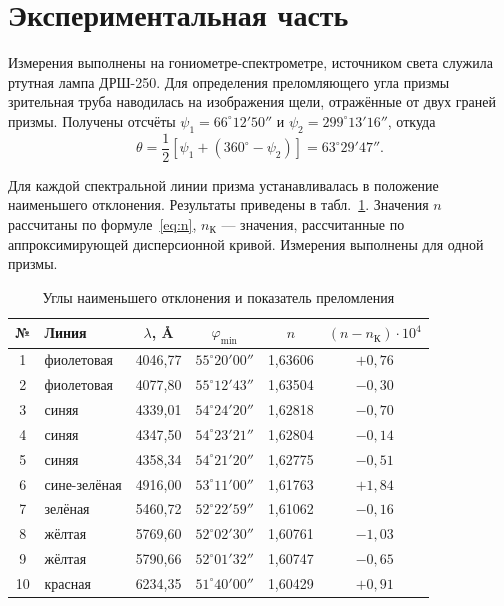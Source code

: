 \documentclass[14pt,a4paper]{extarticle}
\begin{document}
\section*{Экспериментальная часть}

Измерения выполнены на гониометре-спектрометре, источником света служила ртутная лампа ДРШ-250. Для определения преломляющего угла призмы зрительная труба наводилась на изображения щели, отражённые от двух граней призмы. Получены отсчёты $\psi_1 = 66^\circ 12' 50''$ и $\psi_2 = 299^\circ 13' 16''$, откуда
\[
  \theta = \frac{1}{2}\left[\psi_1 + \left(360^\circ - \psi_2\right)\right] = 63^\circ 29' 47''.
\]

Для каждой спектральной линии призма устанавливалась в положение наименьшего отклонения. Результаты приведены в табл.~\ref{tab:phi}. Значения $n$ рассчитаны по формуле~\eqref{eq:n}, $n_{\text{К}}$ --- значения, рассчитанные по аппроксимирующей дисперсионной кривой. Измерения выполнены для одной призмы.

\begin{table}[htbp]
\caption{Углы наименьшего отклонения и показатель преломления}
\label{tab:phi}
\centering
\small
\setlength{\tabcolsep}{5pt}
\begin{tabular}{clcccc}
\toprule
№ & Линия & $\lambda$, \AA & $\varphi_{\min}$ & $n$ & $(n - n_{\text{К}})\cdot 10^{4}$ \\
\midrule
1 & фиолетовая & 4046,77 & $55^\circ 20' 00''$ & 1,63606 & $+0{,}76$ \\
2 & фиолетовая & 4077,80 & $55^\circ 12' 43''$ & 1,63504 & $-0{,}30$ \\
3 & синяя & 4339,01 & $54^\circ 24' 20''$ & 1,62818 & $-0{,}70$ \\
4 & синяя & 4347,50 & $54^\circ 23' 21''$ & 1,62804 & $-0{,}14$ \\
5 & синяя & 4358,34 & $54^\circ 21' 20''$ & 1,62775 & $-0{,}51$ \\
6 & сине-зелёная & 4916,00 & $53^\circ 11' 00''$ & 1,61763 & $+1{,}84$ \\
7 & зелёная & 5460,72 & $52^\circ 22' 59''$ & 1,61062 & $-0{,}16$ \\
8 & жёлтая & 5769,60 & $52^\circ 02' 30''$ & 1,60761 & $-1{,}03$ \\
9 & жёлтая & 5790,66 & $52^\circ 01' 32''$ & 1,60747 & $-0{,}65$ \\
10 & красная & 6234,35 & $51^\circ 40' 00''$ & 1,60429 & $+0{,}91$ \\
\bottomrule
\end{tabular}
\end{table}
\end{document}
